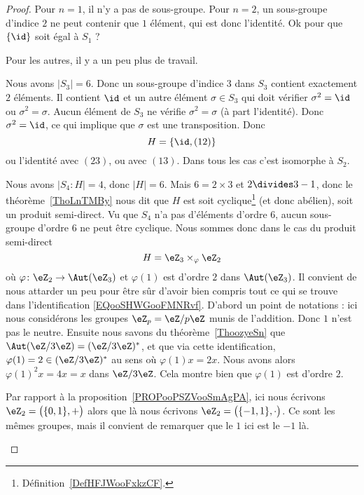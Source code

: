 \begin{proof}
	Pour \( n=1\), il n'y a pas de sous-groupe. Pour \( n=2\), un sous-groupe d'indice \( 2\) ne peut contenir que \( 1\) élément, qui est donc l'identité. Ok pour que \( \{ \id \}\) soit égal à \( S_1\) ?

	Pour les autres, il y a un peu plus de travail.

	\begin{subproof}
		\spitem[Pour \( n=3\)]

		Nous avons \( | S_3 |=6\). Donc un sous-groupe d'indice \( 3\) dans \( S_3\) contient exactement \( 2\) éléments. Il contient \( \id\) et un autre élément \( \sigma\in S_3\) qui doit vérifier \( \sigma^2=\id\) ou \( \sigma^2=\sigma\). Aucun élément de \( S_3\) ne vérifie \( \sigma^2=\sigma\) (à part l'identité). Donc \( \sigma^2=\id\), ce qui implique que \( \sigma\) est une transposition. Donc
		\begin{equation}
			H=\{ \id,(12) \}
		\end{equation}
		ou l'identité avec \( (23)\), ou avec \( (13)\). Dans tous les cas c'est isomorphe à \( S_2\).

		\spitem[Pour \( n=4\)]

		Nous avons \( | S_4:H |=4\), donc \( | H |=6\). Mais \( 6=2\times 3\) et \( 2\divides 3-1\), donc le théorème~\ref{ThoLnTMBy} nous dit que \( H\) est soit cyclique\footnote{Définition~\ref{DefHFJWooFxkzCF}.} (et donc abélien), soit un produit semi-direct. Vu que \( S_4\) n'a pas d'éléments d'ordre \( 6\), aucun sous-groupe d'ordre \( 6\) ne peut être cyclique. Nous sommes donc dans le cas du produit semi-direct
		\begin{equation}        \label{EQooSHWGooFMNRvf}
			H=\eZ_3\times_{\varphi}\eZ_2
		\end{equation}
		où \( \varphi\colon \eZ_2\to \Aut(\eZ_3)\) et \( \varphi(1)\) est d'ordre \( 2\) dans \( \Aut(\eZ_3)\). Il convient de nous attarder un peu pour être sûr d'avoir bien compris tout ce qui se trouve dans l'identification \eqref{EQooSHWGooFMNRvf}. D'abord un point de notations : ici nous considérons les groupes \( \eZ_p=\eZ/p\eZ\) munis de l'addition. Donc \( 1\) n'est pas le neutre. Ensuite nous savons du théorème~\ref{ThoozyeSn} que \( \Aut(\eZ/3\eZ)=(\eZ/3\eZ)^*\), et que via cette identification, \( \varphi(1)=2\in(\eZ/3\eZ)^*\) au sens où \( \varphi(1)x=2x\). Nous avons alors \( \varphi(1)^2x=4x=x\) dans \( \eZ/3\eZ\). Cela montre bien que \( \varphi(1)\) est d'ordre \( 2\).

		Par rapport à la proposition~\ref{PROPooPSZVooSmAgPA}, ici nous écrivons \( \eZ_2=\big( \{ 0,1 \},+ \big)\) alors que là nous écrivons \( \eZ_2=\big( \{ -1,1 \},\cdot \big)\). Ce sont les mêmes groupes, mais il convient de remarquer que le \( 1\) ici est le \( -1\) là.


\end{subproof}
\end{proof}
